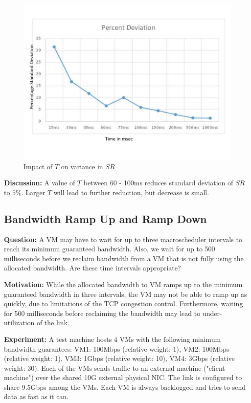 \begin{figure}
\centering
\includegraphics[width=0.7\columnwidth, trim=60pt 20mm 0pt 8mm]{figures/variation}
\caption{Impact of $T$ on variance in $SR$}
\label{variation}
\vspace{-3mm}
\end{figure}

{\bf Discussion:} A value of $T$ between 60 - 100ms reduces standard deviation
of $SR$ to $5\%$.  Larger $T$ will lead to further reduction, but decrease is
small.

\subsection{Bandwidth Ramp Up and Ramp Down}
\label{sec:fairshare}
{\bf Question:} A VM may have to wait for up to three macroscheduler intervals to reach its
minimum guaranteed bandwidth. Also, we wait for up to 500 milliseconds before we
reclaim bandwidth from a VM that is not fully using the allocated bandwidth. Are
these time intervals appropriate?

{\bf Motivation:}  While the allocated bandwidth to VM ramps up to the minimum
guaranteed bandwidth in three intervals, the VM may not be able to ramp up as
quickly, due to limitations of the TCP congestion control. Furthermore, waiting
for 500 milliseconds before reclaiming the bandwidth may lead to
under-utilization of the link.

{\bf Experiment:}  A test machine hosts 4 VMs with the following
minimum bandwidth guarantees: VM1: 100Mbps (relative weight: 1), VM2: 100Mbps
(relative weight: 1), VM3: 1Gbps (relative weight: 10), VM4: 3Gbps (relative
weight: 30). Each of the VMs sends traffic to an external machine ("client
machine") over the shared 10G external physical NIC.  The link is configured to
share 9.5Gbps among the VMs.  Each VM is always 
backlogged and tries to send data as fast as it can.

